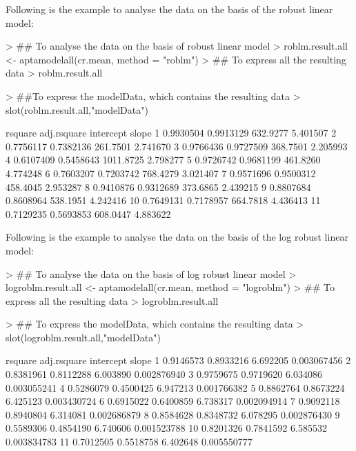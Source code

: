 \documentclass[11pt]{article}
\begin{document}
Following is the example to analyse the data on the basis of the robust linear model:
\begin{Schunk}
\begin{Sinput}
> ## To analyse the data on the basis of robust linear model
> roblm.result.all <- aptamodelall(cr.mean, method = "roblm")
> ## To express all the resulting data
> roblm.result.all
\end{Sinput}
\end{Schunk}

\begin{Schunk}
\begin{Sinput}
> ##To express the modelData, which contains the resulting data
> slot(roblm.result.all,"modelData")
\end{Sinput}
\begin{Soutput}
     rsquare adj.rsquare intercept    slope
1  0.9930504   0.9913129  632.9277 5.401507
2  0.7756117   0.7382136  261.7501 2.741670
3  0.9766436   0.9727509  368.7501 2.205993
4  0.6107409   0.5458643 1011.8725 2.798277
5  0.9726742   0.9681199  461.8260 4.774248
6  0.7603207   0.7203742  768.4279 3.021407
7  0.9571696   0.9500312  458.4045 2.953287
8  0.9410876   0.9312689  373.6865 2.439215
9  0.8807684   0.8608964  538.1951 4.242416
10 0.7649131   0.7178957  664.7818 4.436413
11 0.7129235   0.5693853  608.0447 4.883622
\end{Soutput}
\end{Schunk}

Following is the example to analyse the data on the basis of the log robust linear model:
\begin{Schunk}
\begin{Sinput}
> ## To analyse the data on the basis of log robust linear model
> logroblm.result.all <- aptamodelall(cr.mean, method = "logroblm")
> ## To express all the resulting data
> logroblm.result.all
\end{Sinput}
\end{Schunk}

\begin{Schunk}
\begin{Sinput}
> ## To express the modelData, which contains the resulting data
> slot(logroblm.result.all,"modelData")
\end{Sinput}
\begin{Soutput}
     rsquare adj.rsquare intercept       slope
1  0.9146573   0.8933216  6.692205 0.003067456
2  0.8381961   0.8112288  6.003890 0.002876940
3  0.9759675   0.9719620  6.034086 0.003055241
4  0.5286079   0.4500425  6.947213 0.001766382
5  0.8862764   0.8673224  6.425123 0.003430724
6  0.6915022   0.6400859  6.738317 0.002094914
7  0.9092118   0.8940804  6.314081 0.002686879
8  0.8584628   0.8348732  6.078295 0.002876430
9  0.5589306   0.4854190  6.740606 0.001523788
10 0.8201326   0.7841592  6.585532 0.003834783
11 0.7012505   0.5518758  6.402648 0.005550777
\end{Soutput}
\end{Schunk}
\end{document}
